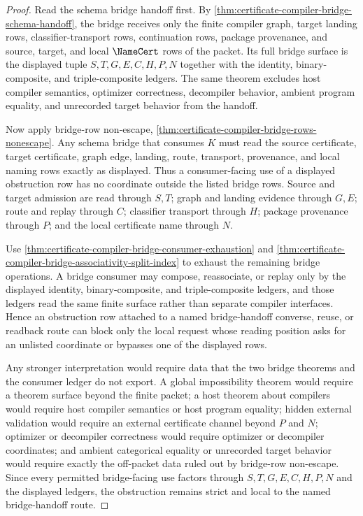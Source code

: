 \begin{proof}
Read the schema bridge handoff first. By \autoref{thm:certificate-compiler-bridge-schema-handoff}, the bridge receives only the finite compiler graph, target landing rows, classifier-transport rows, continuation rows, package provenance, and source, target, and local $\NameCert$ rows of the packet. Its full bridge surface is the displayed tuple $S,T,G,E,C,H,P,N$ together with the identity, binary-composite, and triple-composite ledgers. The same theorem excludes host compiler semantics, optimizer correctness, decompiler behavior, ambient program equality, and unrecorded target behavior from the handoff.

Now apply bridge-row non-escape, \autoref{thm:certificate-compiler-bridge-rows-nonescape}. Any schema bridge that consumes $K$ must read the source certificate, target certificate, graph edge, landing, route, transport, provenance, and local naming rows exactly as displayed. Thus a consumer-facing use of a displayed obstruction row has no coordinate outside the listed bridge rows. Source and target admission are read through $S,T$; graph and landing evidence through $G,E$; route and replay through $C$; classifier transport through $H$; package provenance through $P$; and the local certificate name through $N$.

Use \autoref{thm:certificate-compiler-bridge-consumer-exhaustion} and \autoref{thm:certificate-compiler-bridge-associativity-split-index} to exhaust the remaining bridge operations. A bridge consumer may compose, reassociate, or replay only by the displayed identity, binary-composite, and triple-composite ledgers, and those ledgers read the same finite surface rather than separate compiler interfaces. Hence an obstruction row attached to a named bridge-handoff converse, reuse, or readback route can block only the local request whose reading position asks for an unlisted coordinate or bypasses one of the displayed rows.

Any stronger interpretation would require data that the two bridge theorems and the consumer ledger do not export. A global impossibility theorem would require a theorem surface beyond the finite packet; a host theorem about compilers would require host compiler semantics or host program equality; hidden external validation would require an external certificate channel beyond $P$ and $N$; optimizer or decompiler correctness would require optimizer or decompiler coordinates; and ambient categorical equality or unrecorded target behavior would require exactly the off-packet data ruled out by bridge-row non-escape. Since every permitted bridge-facing use factors through $S,T,G,E,C,H,P,N$ and the displayed ledgers, the obstruction remains strict and local to the named bridge-handoff route.
\end{proof}
